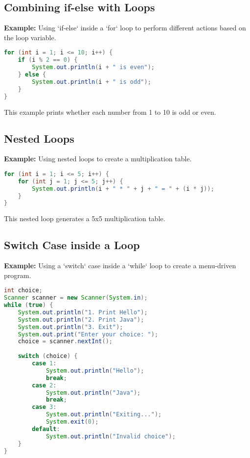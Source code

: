 \documentclass{article}
\begin{document}
\subsection{Combining if-else with Loops}
\textbf{Example:} Using `if-else` inside a `for` loop to perform different actions based on the loop variable.

\begin{lstlisting}[language=Java]
for (int i = 1; i <= 10; i++) {
    if (i % 2 == 0) {
        System.out.println(i + " is even");
    } else {
        System.out.println(i + " is odd");
    }
}
\end{lstlisting}

This example prints whether each number from 1 to 10 is odd or even.

\subsection{Nested Loops}
\textbf{Example:} Using nested loops to create a multiplication table.

\begin{lstlisting}[language=Java]
for (int i = 1; i <= 5; i++) {
    for (int j = 1; j <= 5; j++) {
        System.out.println(i + " * " + j + " = " + (i * j));
    }
}
\end{lstlisting}

This nested loop generates a 5x5 multiplication table.

\newpage
\subsection{Switch Case inside a Loop}
\textbf{Example:} Using a `switch` case inside a `while` loop to create a menu-driven program.

\begin{lstlisting}[language=Java]
int choice;
Scanner scanner = new Scanner(System.in);
while (true) {
    System.out.println("1. Print Hello");
    System.out.println("2. Print Java");
    System.out.println("3. Exit");
    System.out.print("Enter your choice: ");
    choice = scanner.nextInt();
    
    switch (choice) {
        case 1:
            System.out.println("Hello");
            break;
        case 2:
            System.out.println("Java");
            break;
        case 3:
            System.out.println("Exiting...");
            System.exit(0);
        default:
            System.out.println("Invalid choice");
    }
}
\end{lstlisting}
\end{document}
